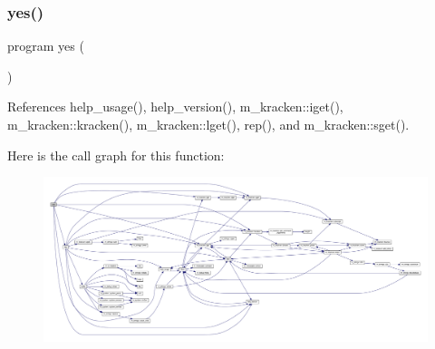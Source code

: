 \subsubsection{\texorpdfstring{yes()}{yes()}}
{\footnotesize\ttfamily program yes (\begin{DoxyParamCaption}{ }\end{DoxyParamCaption})}



References help\+\_\+usage(), help\+\_\+version(), m\+\_\+kracken\+::iget(), m\+\_\+kracken\+::kracken(), m\+\_\+kracken\+::lget(), rep(), and m\+\_\+kracken\+::sget().

Here is the call graph for this function\+:
\nopagebreak
\begin{figure}[H]
\begin{center}
\leavevmode
\includegraphics[width=350pt]{__yes_8f90_a5366917561a9747837d99d886f06cbd7_cgraph}
\end{center}
\end{figure}
